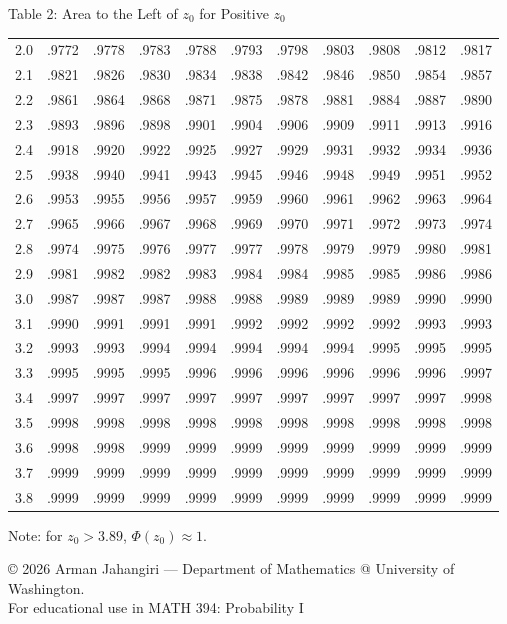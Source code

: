 \documentclass[11pt]{article}
\begin{document}
\begin{distbox}{Table 2: Area to the Left of $z_0$ for Positive $z_0$}
\begin{tabular}{c|cccccccccc}
2.0 & .9772 & .9778 & .9783 & .9788 & .9793 & .9798 & .9803 & .9808 & .9812 & .9817 \\
2.1 & .9821 & .9826 & .9830 & .9834 & .9838 & .9842 & .9846 & .9850 & .9854 & .9857 \\
2.2 & .9861 & .9864 & .9868 & .9871 & .9875 & .9878 & .9881 & .9884 & .9887 & .9890 \\
2.3 & .9893 & .9896 & .9898 & .9901 & .9904 & .9906 & .9909 & .9911 & .9913 & .9916 \\
2.4 & .9918 & .9920 & .9922 & .9925 & .9927 & .9929 & .9931 & .9932 & .9934 & .9936 \\
2.5 & .9938 & .9940 & .9941 & .9943 & .9945 & .9946 & .9948 & .9949 & .9951 & .9952 \\
2.6 & .9953 & .9955 & .9956 & .9957 & .9959 & .9960 & .9961 & .9962 & .9963 & .9964 \\
2.7 & .9965 & .9966 & .9967 & .9968 & .9969 & .9970 & .9971 & .9972 & .9973 & .9974 \\
2.8 & .9974 & .9975 & .9976 & .9977 & .9977 & .9978 & .9979 & .9979 & .9980 & .9981 \\
2.9 & .9981 & .9982 & .9982 & .9983 & .9984 & .9984 & .9985 & .9985 & .9986 & .9986 \\
3.0 & .9987 & .9987 & .9987 & .9988 & .9988 & .9989 & .9989 & .9989 & .9990 & .9990 \\
3.1 & .9990 & .9991 & .9991 & .9991 & .9992 & .9992 & .9992 & .9992 & .9993 & .9993 \\
3.2 & .9993 & .9993 & .9994 & .9994 & .9994 & .9994 & .9994 & .9995 & .9995 & .9995 \\
3.3 & .9995 & .9995 & .9995 & .9996 & .9996 & .9996 & .9996 & .9996 & .9996 & .9997 \\
3.4 & .9997 & .9997 & .9997 & .9997 & .9997 & .9997 & .9997 & .9997 & .9997 & .9998 \\
3.5 & .9998 & .9998 & .9998 & .9998 & .9998 & .9998 & .9998 & .9998 & .9998 & .9998 \\
3.6 & .9998 & .9998 & .9999 & .9999 & .9999 & .9999 & .9999 & .9999 & .9999 & .9999 \\
3.7 & .9999 & .9999 & .9999 & .9999 & .9999 & .9999 & .9999 & .9999 & .9999 & .9999 \\
3.8 & .9999 & .9999 & .9999 & .9999 & .9999 & .9999 & .9999 & .9999 & .9999 & .9999 \\
\bottomrule
\end{tabular}

\vspace{1mm}
{\footnotesize Note: for $z_0>3.89$, $\Phi(z_0)\approx 1$.}

\end{distbox}

\vfill

\begin{center}
{\footnotesize
© 2026 Arman Jahangiri — Department of Mathematics @ University of Washington.\\
For educational use in MATH 394: Probability I
}
\end{center}
\end{document}
